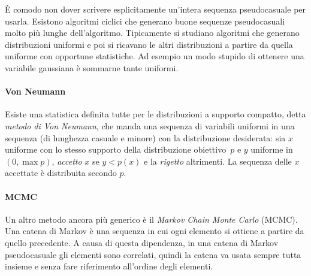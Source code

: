 
È comodo non dover scrivere esplicitamente un'intera sequenza pseudocasuale per usarla.
Esistono algoritmi ciclici che generano buone sequenze pseudocasuali molto più lunghe dell'algoritmo.
Tipicamente si studiano algoritmi che generano distribuzioni uniformi e poi si ricavano le altri distribuzioni a partire da quella uniforme con opportune statistiche.
Ad esempio un modo stupido di ottenere una variabile gaussiana è sommarne tante uniformi.

\paragraph{Von Neumann}

Esiste una statistica definita tutte per le distribuzioni a supporto compatto,
detta \emph{metodo di Von Neumann},
che manda una sequenza di variabili uniformi in una sequenza (di lunghezza casuale e minore) con la distribuzione desiderata:
sia $x$ uniforme con lo stesso supporto della distribuzione obiettivo~$p$
e $y$ uniforme in $(0,\max p)$, \emph{accetto} $x$ se $y<p(x)$ e la \emph{rigetto} altrimenti.
La sequenza delle $x$ accettate è distribuita secondo $p$.

\paragraph{MCMC}

Un altro metodo ancora più generico è il \emph{Markov Chain Monte Carlo} (MCMC).
Una catena di Markov è una sequenza in cui ogni elemento si ottiene a partire da quello precedente.
A causa di questa dipendenza,
in una catena di Markov pseudocasuale gli elementi sono correlati,
quindi la catena va usata sempre tutta insieme e senza fare riferimento all'ordine degli elementi.

